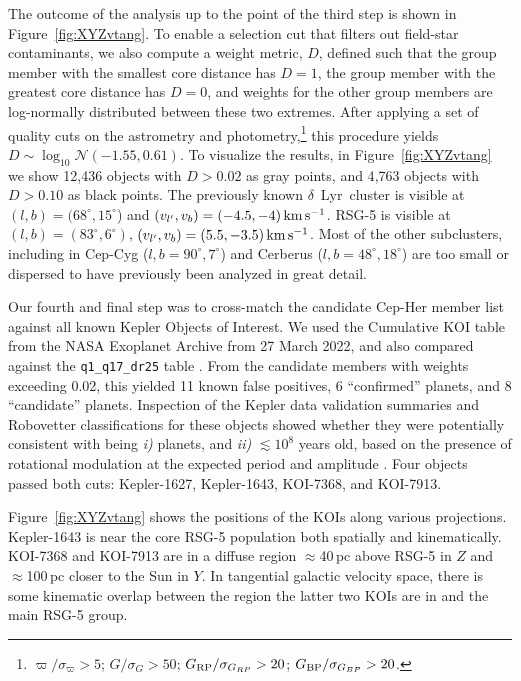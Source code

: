 \documentclass[12pt,twocolumn]{aastex63}
\newcommand{\mkms}{{\rm \,km\,s^{-1}}}  %
\begin{document}
The outcome of the analysis up to the point of the third step is shown
in Figure~\ref{fig:XYZvtang}.  To enable a selection cut that filters
out field-star contaminants, we also compute a weight metric,
$D$, defined such that the group member with the smallest core
distance has $D=1$, the group member with the greatest core
distance has $D=0$, and weights for the other group members are
log-normally distributed between these two extremes.  After applying a
set of quality cuts on the astrometry and
photometry,\footnote{$\varpi/\sigma_\varpi>5$; $G/\sigma_{G}>50$;
$G_{\rm RP}/\sigma_{G_{RP}}>20$; $G_{\rm BP}/\sigma_{G_{BP}}>20$.}
this procedure yields $D \sim \log_{10}\mathcal{N}(-1.55,0.61)$.
To visualize the results, in Figure~\ref{fig:XYZvtang} we show
12{,}436 objects with $D>0.02$ as gray points, and 
4{,}763 objects with $D>0.10$ as black points.  The previously
known $\delta$~Lyr\ cluster is visible at $(l,b)=(68^\circ,15^\circ$)
and $(v_{l'}, v_b)=(-4.5 ,-4 )\mkms$.  RSG-5 is visible at
$(l,b)=(83^\circ,6^\circ)$, $(v_{l'}, v_b)=(5.5 ,-3.5 )\mkms$.  Most
of the other subclusters, including in Cep-Cyg
($l,b=90^\circ,7^\circ$) and Cerberus ($l,b=48^\circ,18^\circ$) are
too small or dispersed to have previously been analyzed in great
detail.

%
%
Our fourth and final step was to cross-match the candidate Cep-Her
member list against all known Kepler Objects of Interest.  We used the
Cumulative KOI table from the NASA Exoplanet Archive from 27 March
2022, and also compared against the \texttt{q1\_q17\_dr25} table
\citep{thompson_planetary_2018}.  From the candidate members with
weights exceeding 0.02, this yielded 11 known false positives, 6
``confirmed'' planets, and 8 ``candidate'' planets.  Inspection of the
Kepler data validation summaries and Robovetter classifications for
these objects showed whether they were potentially consistent with
being {\it i)} planets, and {\it ii)} $\lesssim 10^8$ years old, based
on the presence of rotational modulation at the expected period and
amplitude \citep[{e.g.},][Figure~9]{rebull_rotation_2020}. 
Four
objects passed both cuts: Kepler-1627, Kepler-1643,
KOI-7368, and KOI-7913.

Figure~\ref{fig:XYZvtang} shows the positions of the KOIs along
various projections.  Kepler-1643 is near the core RSG-5 population
both spatially and kinematically.  KOI-7368 and KOI-7913 are in a
diffuse region $\approx$40\,pc above RSG-5 in $Z$ and $\approx$100\,pc
closer to the Sun in $Y$.  In tangential galactic velocity space,
there is some kinematic overlap between the region the latter two KOIs
are in and the main RSG-5 group.
\end{document}
